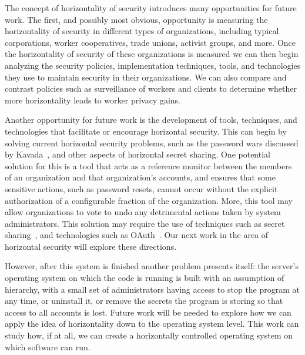 The concept of horizontality of security introduces many opportunities for
future work. The first, and possibly most obvious, opportunity is measuring the
horizontality of security in different types of organizations, including typical
corporations, worker cooperatives, trade unions, activist groups, and more.
Once the horizontality of security of these organizations is measured we can
then begin analyzing the security policies, implementation techniques, tools,
and technologies they use to maintain security in their organizations. We can
also compare and contrast policies such as surveillance of workers and clients
to determine whether more horizontality leads to worker privacy gains.

Another opportunity for future work is the development of tools, techniques, and
technologies that facilitate or encourage horizontal security. This can begin by
solving current horizontal security problems, such as the password wars
discussed by Kavada~\cite{kavada2020counterpublics}, and other aspects of 
horizontal secret sharing. One potential solution for this is a tool that acts
as a reference monitor between the members of an organization and that
organization's accounts, and ensures that some sensitive actions, such as
password resets, cannot occur without the explicit authorization of a
configurable fraction of the organization. More, this tool may allow
organizations to vote to undo any detrimental actions taken by system
administrators. This solution may require the use of techniques such as secret
sharing~\cite{shamir1979share}, and technologies such as 
OAuth~\cite{leiba2012oauth}. Our next work in the area of horizontal security
will explore these directions.

However, after this system is finished another problem presents itself: the
server's operating system on which the code is running is built with an 
assumption of hierarchy, with a small set of administrators having access to
stop the program at any time, or  uninstall it, or remove the secrets the 
program is storing so that access to all accounts is lost. Future work will be
needed to explore how we can apply the idea of horizontality down to the
operating system level. This work can study how, if at all, we can create a
horizontally controlled operating system on which software can run.
